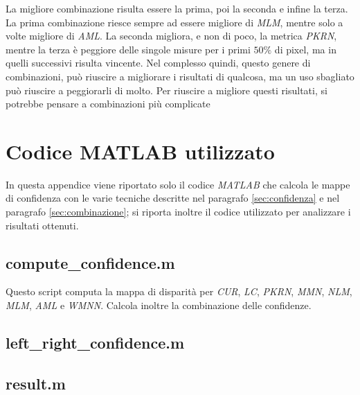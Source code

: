 \documentclass[12pt]{report}
\newcommand{\nullpage}{\newpage\null\thispagestyle{empty}}  %
\begin{document}
		
			La migliore combinazione risulta essere la prima, poi la seconda e infine la terza. La prima combinazione riesce sempre ad essere migliore di \textit{MLM}, mentre solo a volte migliore di \textit{AML}. La seconda migliora, e non di poco, la metrica \textit{PKRN}, mentre la terza è peggiore delle singole misure per i primi $50 \%$ di pixel, ma in quelli successivi risulta vincente. Nel complesso quindi, questo genere di combinazioni, può riuscire a migliorare i risultati di qualcosa, ma un uso sbagliato può riuscire a peggiorarli di molto. \newline
			Per riuscire a migliore questi risultati, si potrebbe pensare a combinazioni più complicate
	

	\nullpage	
	\appendix 
	\renewcommand\chaptername{Appendice}
	
	\chapter{Codice MATLAB utilizzato}
	\label{sec:codice}
	
		In questa appendice viene riportato solo il codice \textit{MATLAB} che calcola le mappe di confidenza con le varie tecniche descritte nel paragrafo \ref{sec:confidenza} e nel paragrafo \ref{sec:combinazione}; si riporta inoltre il codice utilizzato per analizzare i risultati ottenuti.
	
		\section{compute\_confidence.m}
		\label{sec:computeConfidence}
		
			Questo script computa la mappa di disparità per \textit{CUR}, \textit{LC}, \textit{PKRN}, \textit{MMN}, \textit{NLM}, \textit{MLM}, \textit{AML} e \textit{WMNN}. Calcola inoltre la combinazione delle confidenze.
	
			
		
		\section{left\_right\_confidence.m}
		\label{sec:leftright}
			
		
		\section{result.m}
		\label{sec:result}
				
			
\end{document}
